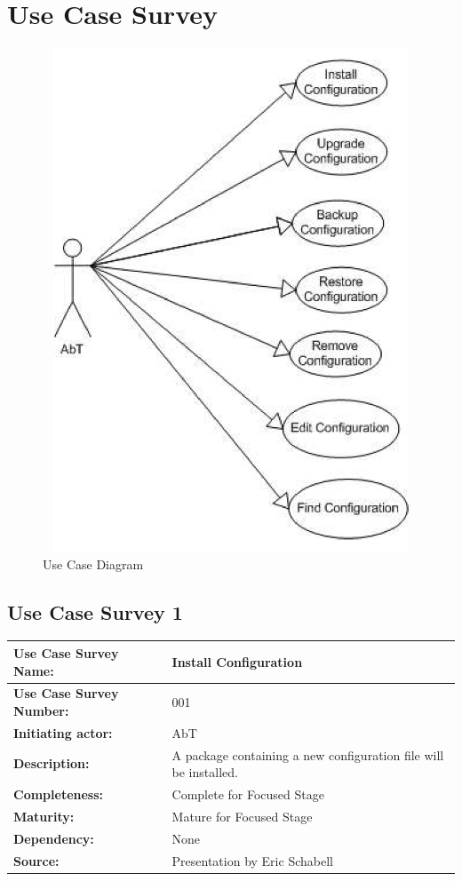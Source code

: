 \newpage

\section{Use Case Survey}

\begin{figure}[htbp]
  \centering
  \includegraphics[angle=0,width=15cm,height=15cm]{"usecasediagram"}
  \caption{Use Case Diagram}
  \label{fig:ucdiagram}
\end{figure}

\subsection{Use Case Survey 1}

\begin{center}
\begin{tabularx}{\linewidth}{|l|p{7.08cm}|}
\hline
\textbf{Use Case Survey Name:} & Install Configuration\\
\hline
\textbf{Use Case Survey Number:} & 001 \\
\hline
\textbf{Initiating actor:} & AbT \\
\hline
\textbf{Description:} & A package containing a new configuration file will be installed. \\
\hline
\textbf{Completeness:} & Complete for Focused Stage \\
\hline
\textbf{Maturity:} & Mature for Focused Stage \\
\hline
\textbf{Dependency:} & None \\
\hline
\textbf{Source:} & Presentation by Eric Schabell \\
\hline
\end{tabularx}
\end{center}

